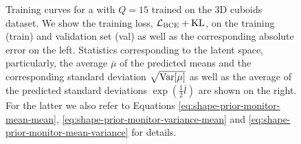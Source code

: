 \begin{figure}[t]
\begin{subfigure}[t]{0.48\textwidth}
  \end{subfigure}
  \caption{Training curves for a \VAE with $Q = 15$ trained on the 3D cuboids dataset. We show
  the training loss, \ie $\mathcal{L}_{\text{BCE}} + \mathrm{KL}$, on the training (train) and validation set (val)
  as well as the corresponding absolute error \Abs on the left. Statistics corresponding to the latent
  space, particularly, the average $\overline{\mu}$ of the predicted means and the corresponding 
  standard deviation $\sqrt{\mathrm{Var}[\mu]}$ as well as the average of the predicted standard
  deviations $\exp(\frac{1}{2} \overline{l})$ are shown on the right. For the latter we also
  refer to Equations \eqref{eq:shape-prior-monitor-mean-mean}, \eqref{eq:shape-prior-monitor-variance-mean}
  and \eqref{eq:shape-prior-monitor-mean-variance} for details.}
  \label{fig:experiments-3d-vae-t}
\end{figure}

